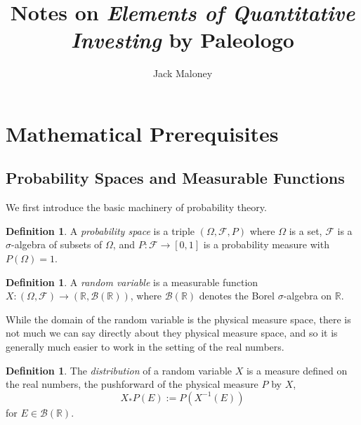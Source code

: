 \documentclass[11pt]{amsart}
\theoremstyle{definition}
\newtheorem{definition}[theorem]{Definition}
\theoremstyle{remark}
\begin{document}
\title{Notes on \textit{Elements of Quantitative Investing} by Paleologo}
\author{Jack Maloney}


\maketitle

\section{Mathematical Prerequisites}

\subsection{Probability Spaces and Measurable Functions}

We first introduce the basic machinery of probability theory.

\begin{definition}
A \emph{probability space} is a triple $(\Omega, \mathcal{F}, P)$ where $\Omega$ is a set, $\mathcal{F}$ is a $\sigma$-algebra of subsets of $\Omega$, and $P: \mathcal{F} \to [0,1]$ is a probability measure with $P(\Omega) = 1$.
\end{definition}

\begin{definition}
A \emph{random variable} is a measurable function $X: (\Omega, \mathcal{F}) \to (\mathbb{R}, \mathcal{B}(\mathbb{R}))$, where $\mathcal{B}(\mathbb{R})$ denotes the Borel $\sigma$-algebra on $\mathbb{R}$.
\end{definition}

While the domain of the random variable is the physical measure space, there is not much we can say directly about they physical measure space, and so it is generally much easier to work in the setting of the real numbers.

\begin{definition}
The \emph{distribution} of a random variable \(X\) is a measure defined on the real numbers, the pushforward of the physical measure \(P\) by \(X\),
\[
X_{*}P (E) := P \left( X^{-1}(E) \right)
\]
for \(E \in \mathcal{B}(\mathbb{R})\).
\end{definition}
\end{document}
